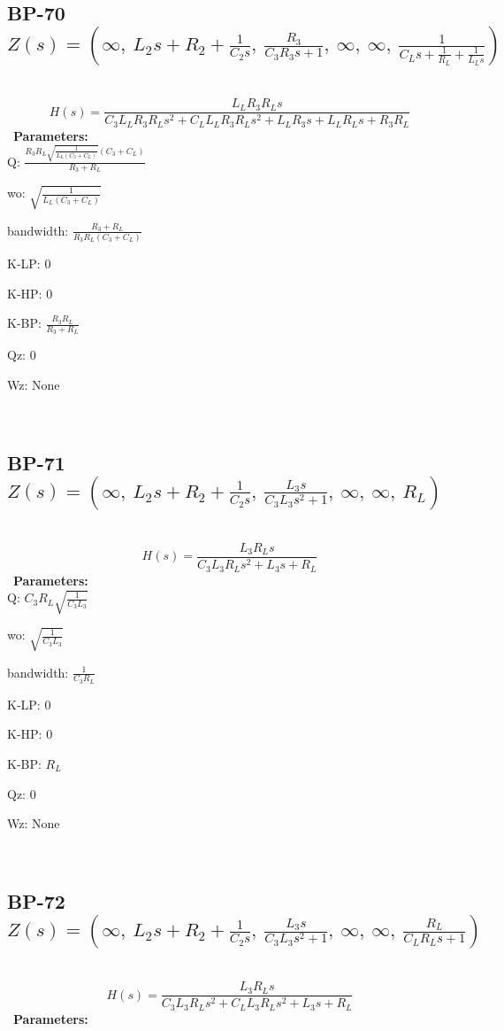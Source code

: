 \documentclass{article}
\begin{document}
\ 

\subsection{BP-70 $Z(s) = \left( \infty, \  L_{2} s + R_{2} + \frac{1}{C_{2} s}, \  \frac{R_{3}}{C_{3} R_{3} s + 1}, \  \infty, \  \infty, \  \frac{1}{C_{L} s + \frac{1}{R_{L}} + \frac{1}{L_{L} s}}\right)$ } \ 
\textbf{\[H(s) = \frac{L_{L} R_{3} R_{L} s}{C_{3} L_{L} R_{3} R_{L} s^{2} + C_{L} L_{L} R_{3} R_{L} s^{2} + L_{L} R_{3} s + L_{L} R_{L} s + R_{3} R_{L}}\] } \ 
\textbf{Parameters:}\\ 

Q: $\frac{R_{3} R_{L} \sqrt{\frac{1}{L_{L} \left(C_{3} + C_{L}\right)}} \left(C_{3} + C_{L}\right)}{R_{3} + R_{L}}$\ 

wo: $\sqrt{\frac{1}{L_{L} \left(C_{3} + C_{L}\right)}}$\ 

bandwidth: $\frac{R_{3} + R_{L}}{R_{3} R_{L} \left(C_{3} + C_{L}\right)}$\ 

K-LP: $0$\ 

K-HP: $0$\ 

K-BP: $\frac{R_{3} R_{L}}{R_{3} + R_{L}}$\ 

Qz: $0$\ 

Wz: $\text{None}$\ 

\ 

\subsection{BP-71 $Z(s) = \left( \infty, \  L_{2} s + R_{2} + \frac{1}{C_{2} s}, \  \frac{L_{3} s}{C_{3} L_{3} s^{2} + 1}, \  \infty, \  \infty, \  R_{L}\right)$ } \ 
\textbf{\[H(s) = \frac{L_{3} R_{L} s}{C_{3} L_{3} R_{L} s^{2} + L_{3} s + R_{L}}\] } \ 
\textbf{Parameters:}\\ 

Q: $C_{3} R_{L} \sqrt{\frac{1}{C_{3} L_{3}}}$\ 

wo: $\sqrt{\frac{1}{C_{3} L_{3}}}$\ 

bandwidth: $\frac{1}{C_{3} R_{L}}$\ 

K-LP: $0$\ 

K-HP: $0$\ 

K-BP: $R_{L}$\ 

Qz: $0$\ 

Wz: $\text{None}$\ 

\ 

\subsection{BP-72 $Z(s) = \left( \infty, \  L_{2} s + R_{2} + \frac{1}{C_{2} s}, \  \frac{L_{3} s}{C_{3} L_{3} s^{2} + 1}, \  \infty, \  \infty, \  \frac{R_{L}}{C_{L} R_{L} s + 1}\right)$ } \ 
\textbf{\[H(s) = \frac{L_{3} R_{L} s}{C_{3} L_{3} R_{L} s^{2} + C_{L} L_{3} R_{L} s^{2} + L_{3} s + R_{L}}\] } \ 
\textbf{Parameters:}\\ 
\end{document}
